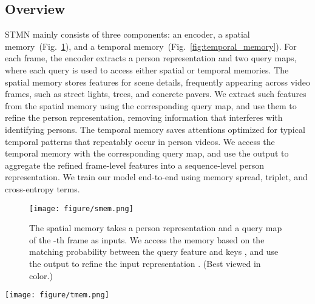 \documentclass[10pt,twocolumn,letterpaper]{article}
\begin{document}
	\vspace{-0.1cm}
	\subsection{Overview} \label{subsec:overview}
	\vspace{-0.2cm}
	
		STMN mainly consists of three components: an encoder, a spatial memory~(Fig.~\ref{fig:spatial_memory}), and a temporal memory~(Fig.~\ref{fig:temporal_memory}). For each frame, the encoder extracts a person representation and two query maps, where each query is used to access either spatial or temporal memories. The spatial memory stores features for scene details, frequently appearing across video frames, such as street lights, trees, and concrete pavers. We extract such features from the spatial memory using the corresponding query map, and use them to refine the person representation, removing information that interferes with identifying persons. The temporal memory saves attentions optimized for typical temporal patterns that repeatably occur in person videos. We access the temporal memory with the corresponding query map, and use the output to aggregate the refined frame-level features into a sequence-level person representation. We train our model end-to-end using memory spread, triplet, and cross-entropy terms.
		
		\begin{figure}
			\centering
			\texttt{[image: figure/smem.png]}
		\caption{The spatial memory takes a person representation  and a query map  of the -th frame as inputs. We access the memory based on the matching probability between the query feature  and keys , and use the output to refine the input representation . (Best viewed in color.)}
		\vspace{-0.5cm}
		\label{fig:spatial_memory}
		\end{figure}
		
		\begin{figure*}
			\centering
			\texttt{[image: figure/tmem.png]}
		\caption{The temporal memory takes a sequence of query maps  and the person representations  that are refined by the spatial memory as inputs. We aggregate the query maps by using global average pooling and LSTM modules, and use the output to address the memory. The memory outputs temporal attentions , and the attentions are used to aggregate the frame-level representations into a sequence-level one. (Best viewed in color.)}
		\vspace{-0.5cm}
		\label{fig:temporal_memory}
		\end{figure*}
		
\end{document}
